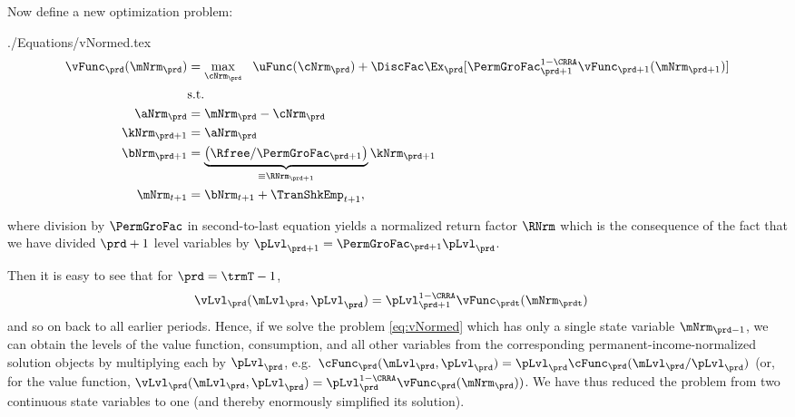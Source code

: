 \documentclass[\econtexRoot/SolvingMicroDSOPs]{subfiles}
\begin{document}
Now define a new optimization problem:
\begin{verbatimwrite}{./Equations/vNormed.tex}
  \begin{equation}\begin{gathered}\begin{aligned}
        \vFunc_{\prd}({\mNrm}_{\prd}) & = \max_{{\cNrm}_{\prd}} ~~ \uFunc({\cNrm}_{\prd})+{\DiscFac}\Ex_{\prd}[ \PermGroFac_{\prd+1}^{1-\CRRA}\vFunc_{\prd+1}({\mNrm}_{\prd+1})] \label{eq:vNormed}                   \\
                                         & \text{s.t.}                                                                                 \\
        {\aNrm}_{\prd}                       & = {\mNrm}_{\prd}-{\cNrm}_{\prd}                                                                     \\
        {\kNrm}_{\prd+1}                     & = {\aNrm}_{\prd}                                                                                \\
        {\bNrm}_{\prd+1}                     & = \underbrace{\left(\Rfree/\PermGroFac_{\prd+1}\right)}_{\equiv \RNrm_{\prd+1}}{\kNrm}_{\prd+1} \\
        {\mNrm}_{t+1}                        & = {\bNrm}_{t+1}+\TranShkEmp_{t+1},
      \end{aligned}\end{gathered}\end{equation}
\end{verbatimwrite}
\unskip
where division by $\PermGroFac$ in second-to-last equation yields a normalized return factor $\RNrm$ which is the consequence of the fact that we have divided $\prd+1$ level variables by $\pLvl_{\prd+1}=\PermGroFac_{\prd+1}\pLvl_{\prd}$.

Then it is easy to see that for $\prd=\trmT-1$, 
\begin{equation*}\begin{gathered}\begin{aligned}
      \vLvl_{\prd}(\mLvl_{\prd},\pLvl_{\prd}) & =  \pLvl_{\prd+1}^{1-\CRRA}\vFunc_{\prdt}({\mNrm}_{\prdt})
    \end{aligned}\end{gathered}\end{equation*}
and so on back to all earlier periods.  Hence, if we solve the problem \eqref{eq:vNormed} which has only a single state variable $\mNrm_{\prd-1}$, we can obtain the levels of the value function, consumption, and all other variables from the corresponding permanent-income-normalized solution objects by multiplying each by $\pLvl_{\prd}$, e.g.\ $\cFunc_{\prd}(\mLvl_{\prd},\pLvl_{\prd})=\pLvl_{\prd}\cFunc_{\prd}(\mLvl_{\prd}/\pLvl_{\prd})$ (or, for the value function, $\vLvl _{\prd}(\mLvl_{\prd},\pLvl_{\prd}) = \pLvl_{\prd}^{1-\CRRA}\vFunc_{\prd}({\mNrm}_{\prd}))$.  We have thus reduced the problem from two continuous state variables to one (and thereby enormously simplified its solution).
\end{document}

